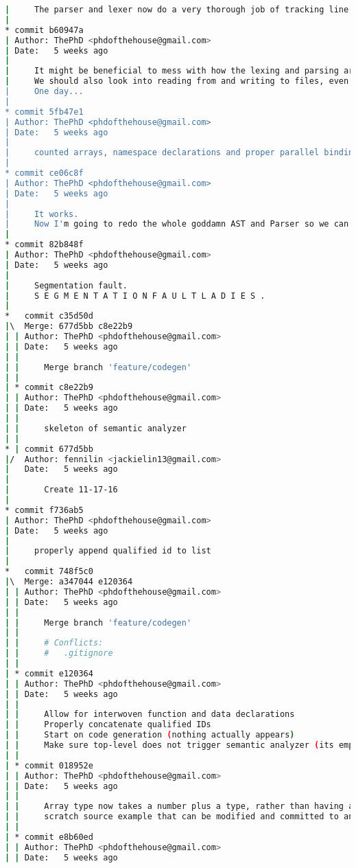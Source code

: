 \begin{lstlisting}[language=bash]
|     The parser and lexer now do a very thorough job of tracking line information; may want to propogate into the AST somehow
|  
* commit b60947a
| Author: ThePhD <phdofthehouse@gmail.com>
| Date:   5 weeks ago
| 
|     It might be beneficial to mess with how the lexing and parsing are run through, so we can generate the proper line numbers and token lists.
|     We should also look into reading from and writing to files, even if we don't have the Batteries library and other bits set up for this.
|     One day...
|  
* commit 5fb47e1
| Author: ThePhD <phdofthehouse@gmail.com>
| Date:   5 weeks ago
| 
|     counted arrays, namespace declarations and proper parallel binding declarations
|  
* commit ce06c8f
| Author: ThePhD <phdofthehouse@gmail.com>
| Date:   5 weeks ago
| 
|     It works.
|     Now I'm going to redo the whole goddamn AST and Parser so we can really get going...
|  
* commit 82b848f
| Author: ThePhD <phdofthehouse@gmail.com>
| Date:   5 weeks ago
| 
|     Segmentation fault.
|     S E G M E N T A T I O N F A U L T L A D I E S .
|    
*   commit c35d50d
|\  Merge: 677d5bb c8e22b9
| | Author: ThePhD <phdofthehouse@gmail.com>
| | Date:   5 weeks ago
| | 
| |     Merge branch 'feature/codegen'
| |   
| * commit c8e22b9
| | Author: ThePhD <phdofthehouse@gmail.com>
| | Date:   5 weeks ago
| | 
| |     skeleton of semantic analyzer
| |   
* | commit 677d5bb
|/  Author: fennilin <jackielin13@gmail.com>
|   Date:   5 weeks ago
|   
|       Create 11-17-16
|  
* commit f736ab5
| Author: ThePhD <phdofthehouse@gmail.com>
| Date:   5 weeks ago
| 
|     properly append qualified id to list
|    
*   commit 748f5c0
|\  Merge: a347044 e120364
| | Author: ThePhD <phdofthehouse@gmail.com>
| | Date:   5 weeks ago
| | 
| |     Merge branch 'feature/codegen'
| |     
| |     # Conflicts:
| |     #	.gitignore
| |   
| * commit e120364
| | Author: ThePhD <phdofthehouse@gmail.com>
| | Date:   5 weeks ago
| | 
| |     Allow for interwoven function and data declarations
| |     Properly concatenate qualified IDs
| |     Start on code generation (nothing actually appears)
| |     Make sure top-level does not trigger semantic analyzer (its empty right now)
| |   
| * commit 018952e
| | Author: ThePhD <phdofthehouse@gmail.com>
| | Date:   5 weeks ago
| | 
| |     Array type now takes a number plus a type, rather than having a separate type for each one
| |     scratch source example that can be modified and committed to any current contention for a person working on the compiler
| |   
| * commit e8b60ed
| | Author: ThePhD <phdofthehouse@gmail.com>
| | Date:   5 weeks ago

\end{lstlisting}
